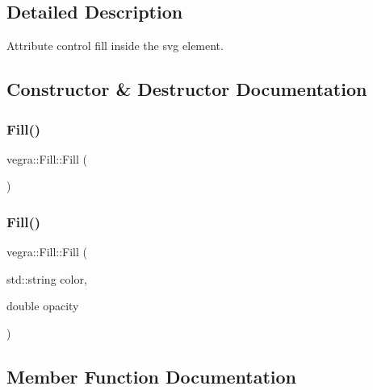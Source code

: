 \subsection{Detailed Description}
Attribute control fill inside the svg element. 

\subsection{Constructor \& Destructor Documentation}
\mbox{\label{structvegra_1_1Fill_aa305a257a120bc2f164853ff5b4f8372}} 
\subsubsection{\texorpdfstring{Fill()}{Fill()}\hspace{0.1cm}{\footnotesize\ttfamily [1/2]}}
{\footnotesize\ttfamily vegra\+::\+Fill\+::\+Fill (\begin{DoxyParamCaption}{ }\end{DoxyParamCaption})\hspace{0.3cm}{\ttfamily [inline]}}

\mbox{\label{structvegra_1_1Fill_abcf0ef6c4fcf15ba55f3c3ec576dc550}} 
\subsubsection{\texorpdfstring{Fill()}{Fill()}\hspace{0.1cm}{\footnotesize\ttfamily [2/2]}}
{\footnotesize\ttfamily vegra\+::\+Fill\+::\+Fill (\begin{DoxyParamCaption}\item[{std\+::string}]{color,  }\item[{double}]{opacity }\end{DoxyParamCaption})\hspace{0.3cm}{\ttfamily [inline]}}



\subsection{Member Function Documentation}
\mbox{\label{structvegra_1_1Fill_a2dddee85ed5bf8e6455af59e69ef0dc8}} 
